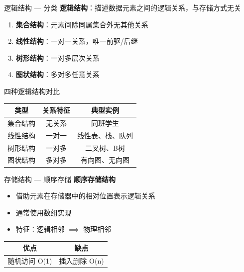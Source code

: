 \documentclass[10pt, aspectratio=169]{beamer}
\begin{document}
\begin{frame}{逻辑结构 --- 分类}
    \textbf{逻辑结构}：描述数据元素之间的逻辑关系，与存储方式无关
    \begin{enumerate}
        \item \textbf{集合结构}：元素间除同属集合外无其他关系
        \item \textbf{线性结构}：一对一关系，唯一前驱/后继
        \item \textbf{树形结构}：一对多层次关系
        \item \textbf{图状结构}：多对多任意关系
    \end{enumerate}
\end{frame}

\begin{frame}{四种逻辑结构对比}
    \begin{center}
    \begin{tabular}{|c|c|c|}
        \hline
        \textbf{类型} & \textbf{关系特征} & \textbf{典型实例} \\
        \hline
        集合结构 & 无关系 & 同班学生 \\
        \hline
        线性结构 & 一对一 & 线性表、栈、队列 \\
        \hline
        树形结构 & 一对多 & 二叉树、B树 \\
        \hline
        图状结构 & 多对多 & 有向图、无向图 \\
        \hline
    \end{tabular}
    \end{center}
\end{frame}

\begin{frame}{存储结构 --- 顺序存储}
    \textbf{顺序存储结构}
    \begin{itemize}
        \item 借助元素在存储器中的相对位置表示逻辑关系
        \item 通常使用数组实现
        \item 特征：逻辑相邻 $\implies$ 物理相邻
    \end{itemize}
    \vspace{0.5em}
    \begin{center}
    \begin{tabular}{|c|c|}
        \hline
        \textbf{优点} & \textbf{缺点} \\
        \hline
        随机访问 O(1) & 插入删除 O(n) \\
        \hline
    \end{tabular}
    \end{center}
\end{frame}
\end{document}
